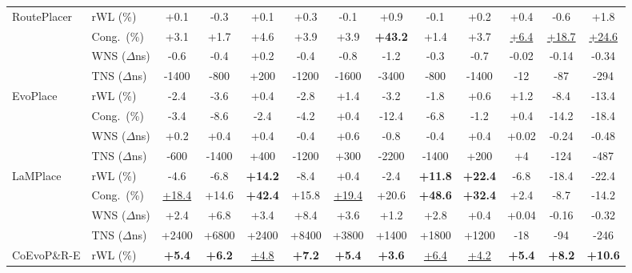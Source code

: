 \begin{table}[!htbp]
{\begin{tabular}{llccccccccccc}
\midrule
\multirow{4}{*}{RoutePlacer}
  & rWL (\%)         & +0.1 & -0.3 & +0.1 & +0.3 & -0.1 & +0.9 & -0.1 & +0.2 & +0.4 & -0.6 & +1.8 \\
  & Cong.\ (\%)      & +3.1 & +1.7 & +4.6 & +3.9 & +3.9 & \cellcolor{rankfirst}\textbf{+43.2} & +1.4 & +3.7 & \cellcolor{ranksecond}\underline{+6.4} & \cellcolor{ranksecond}\underline{+18.7} & \cellcolor{ranksecond}\underline{+24.6} \\
  & WNS ($\Delta$ns) & -0.6 & -0.4 & +0.2 & -0.4 & -0.8 & -1.2 & -0.3 & -0.7 & -0.02 & -0.14 & -0.34 \\
  & TNS ($\Delta$ns) & -1400 & -800 & +200 & -1200 & -1600 & -3400 & -800 & -1400 & -12 & -87 & -294 \\
\midrule
\multirow{4}{*}{EvoPlace}
  & rWL (\%)         & -2.4 & -3.6 & +0.4 & -2.8 & +1.4 & -3.2 & -1.8 & +0.6 & +1.2 & -8.4 & -13.4 \\
  & Cong.\ (\%)      & -3.4 & -8.6 & -2.4 & -4.2 & +0.4 & -12.4 & -6.8 & -1.2 & +0.4 & -14.2 & -18.4 \\
  & WNS ($\Delta$ns) & +0.2 & +0.4 & +0.4 & -0.4 & +0.6 & -0.8 & -0.4 & +0.4 & +0.02 & -0.24 & -0.48 \\
  & TNS ($\Delta$ns) & -600 & -1400 & +400 & -1200 & +300 & -2200 & -1400 & +200 & +4 & -124 & -487 \\
\midrule
\multirow{4}{*}{LaMPlace}
  & rWL (\%)         & -4.6 & -6.8 & \cellcolor{rankfirst}\textbf{+14.2} & -8.4 & +0.4 & -2.4 & \cellcolor{rankfirst}\textbf{+11.8} & \cellcolor{rankfirst}\textbf{+22.4} & -6.8 & -18.4 & -22.4 \\
  & Cong.\ (\%)      & \cellcolor{ranksecond}\underline{+18.4} & +14.6 & \cellcolor{rankfirst}\textbf{+42.4} & +15.8 & \cellcolor{ranksecond}\underline{+19.4} & +20.6 & \cellcolor{rankfirst}\textbf{+48.6} & \cellcolor{rankfirst}\textbf{+32.4} & +2.4 & -8.7 & -14.2 \\
  & WNS ($\Delta$ns) & +2.4 & +6.8 & +3.4 & +8.4 & +3.6 & +1.2 & +2.8 & +0.4 & +0.04 & -0.16 & -0.32 \\
  & TNS ($\Delta$ns) & +2400 & +6800 & +2400 & +8400 & +3800 & +1400 & +1800 & +1200 & -18 & -94 & -246 \\
\midrule
\multirow{4}{*}{CoEvoP\&R-E}
  & rWL (\%)         & \cellcolor{rankfirst}\textbf{+5.4} & \cellcolor{rankfirst}\textbf{+6.2} & \cellcolor{ranksecond}\underline{+4.8} & \cellcolor{rankfirst}\textbf{+7.2} & \cellcolor{rankfirst}\textbf{+5.4} & \cellcolor{rankfirst}\textbf{+3.6} & \cellcolor{ranksecond}\underline{+6.4} & \cellcolor{ranksecond}\underline{+4.2} & \cellcolor{rankfirst}\textbf{+5.4} & \cellcolor{rankfirst}\textbf{+8.2} & \cellcolor{rankfirst}\textbf{+10.6} \\

\end{tabular}}
\end{table}
